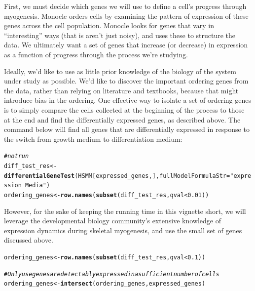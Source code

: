 \documentclass[10pt,oneside]{article}\usepackage[]{graphicx}\usepackage[]{color}
\makeatletter
\newcommand{\hlnum}[1]{\textcolor[rgb]{0.686,0.059,0.569}{#1}}%
\newcommand{\hlstr}[1]{\textcolor[rgb]{0.192,0.494,0.8}{#1}}%
\newcommand{\hlcom}[1]{\textcolor[rgb]{0.678,0.584,0.686}{\textit{#1}}}%
\newcommand{\hlopt}[1]{\textcolor[rgb]{0,0,0}{#1}}%
\newcommand{\hlstd}[1]{\textcolor[rgb]{0.345,0.345,0.345}{#1}}%
\newcommand{\hlkwb}[1]{\textcolor[rgb]{0.69,0.353,0.396}{#1}}%
\newcommand{\hlkwc}[1]{\textcolor[rgb]{0.333,0.667,0.333}{#1}}%
\newcommand{\hlkwd}[1]{\textcolor[rgb]{0.737,0.353,0.396}{\textbf{#1}}}%
\newenvironment{kframe}{%
 \def\at@end@of@kframe{}%
 \ifinner\ifhmode%
  \def\at@end@of@kframe{\end{minipage}}%
  \begin{minipage}{\columnwidth}%
 \fi\fi%
 \def\FrameCommand##1{\hskip\@totalleftmargin \hskip-\fboxsep
 \colorbox{shadecolor}{##1}\hskip-\fboxsep
     \hskip-\linewidth \hskip-\@totalleftmargin \hskip\columnwidth}%
 \MakeFramed {\advance\hsize-\width
   \@totalleftmargin\z@ \linewidth\hsize
   \@setminipage}}%
 {\par\unskip\endMakeFramed%
 \at@end@of@kframe}
\newenvironment{knitrout}{}{} %
\makeatother
\begin{document}
First, we must decide which genes we will use to define a cell's progress through myogenesis. Monocle orders cells by examining the pattern of expression of these genes across the cell population.  Monocle looks for genes that vary in ``interesting'' ways (that is aren't just noisy), and uses these to structure the data. We ultimately want a set of genes that increase (or decrease) in expression as a function of progress through the process we're studying. 

Ideally, we'd like to use as little prior knowledge of the biology of the system under study as possible. We'd like to discover the important ordering genes from the data, rather than relying on literature and textbooks, because that might introduce bias in the ordering. One effective way to isolate a set of ordering genes is to simply compare the cells collected at the beginning of the process to those at the end and find the differentially expressed genes, as described above. The command below will find all genes that are differentially expressed in response to the switch from growth medium to differentiation medium:

\begin{knitrout}
\color{fgcolor}\begin{kframe}
\begin{alltt}
\hlcom{# not run}
\hlstd{diff_test_res} \hlkwb{<-} \hlkwd{differentialGeneTest}\hlstd{(HSMM[expressed_genes, ],} \hlkwc{fullModelFormulaStr} \hlstd{=} \hlstr{"expression~Media"}\hlstd{)}
\hlstd{ordering_genes} \hlkwb{<-} \hlkwd{row.names}\hlstd{(}\hlkwd{subset}\hlstd{(diff_test_res, qval} \hlopt{<} \hlnum{0.01}\hlstd{))}
\end{alltt}
\end{kframe}
\end{knitrout}


However, for the sake of keeping the running time in this vignette short, we will leverage the developmental biology community's extensive knowledge of expression dynamics during skeletal myogenesis, and use the small set of genes discussed above.

\begin{knitrout}
\color{fgcolor}\begin{kframe}
\begin{alltt}
\hlstd{ordering_genes} \hlkwb{<-} \hlkwd{row.names}\hlstd{(}\hlkwd{subset}\hlstd{(diff_test_res, qval} \hlopt{<} \hlnum{0.1}\hlstd{))}

\hlcom{# Only use genes are detectably expressed in a sufficient number of cells}
\hlstd{ordering_genes} \hlkwb{<-} \hlkwd{intersect}\hlstd{(ordering_genes, expressed_genes)}
\end{alltt}
\end{kframe}
\end{knitrout}
\end{document}
